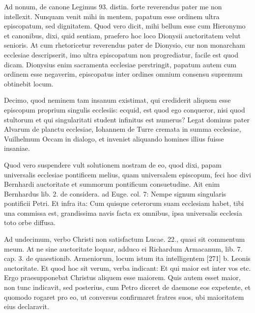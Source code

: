 Ad nonum, de canone Legimus 93. distin. forte reverendus pater me non intellexit. Nunquam venit mihi in mentem, papatum esse ordinem ultra episcopatum, sed dignitatem. Quod vero dicit, mihi bellum esse cum Hieronymo et canonibus, dixi, quid sentiam, praefero hoc loco Dionysii auctoritatem velut senioris. At cum rhetoricetur reverendus pater de Dionysio, cur non monarcham ecclesiae descripserit, imo ultra episcopatum non progrediatur, facile est quod dicam. Dionysius enim sacramenta ecclesiae perstringit, papatum autem cum ordinem esse negaverim, episcopatus inter ordines omnium consensu supremum obtinebit locum.

Decimo, quod neminem tam insanum existimat, qui crediderit aliquem esse episcopum proprium singulis ecclesiis: ecquid, est quod ego conqueror, nisi quod stultorum et qui singularitati student infinitus est numerus? Legat dominus pater Alvarum de planctu ecclesiae, Iohannem de Turre cremata in summa ecclesiae, Vuilhelmum Occam in dialogo, et inveniet aliquando homines illius fuisse insaniae.

Quod vero suspendere vult solutionem nostram de eo, quod dixi, papam universalis ecclesiae pontificem melius, quam universalem episcopum, feci hoc divi Bernhardi auctoritate et summorum pontificum consuetudine. Ait enim Bernhardus lib. 2. de considera. ad Euge. col. 7: Nempe signum singularis pontificii Petri. Et infra ita: Cum quisque ceterorum suam ecclesiam habet, tibi una commissa est, grandissima navis facta ex omnibus, ipsa universalis ecclesia toto orbe diffusa.

Ad undecimum, verbo Christi non satisfactum Lucae. 22., quasi sit commentum meum. At ne sine auctoritate loquar, adduco ei Richardum Armacanum, lib. 7. cap. 3. de quaestionib. Armeniorum, locum istum ita intelligentem [271] b. Leonis auctoritate. Et quod hoc sit verum, verba indicant: Et qui maior est inter vos etc. Ergo praesupponebat Christus aliquem esse maiorem. Quis autem esset maior, non tunc indicavit, sed posterius, cum Petro diceret de daemone eos expetente, et quomodo rogaret pro eo, ut conversus confirmaret fratres suos, ubi maioritatem eius declaravit.

